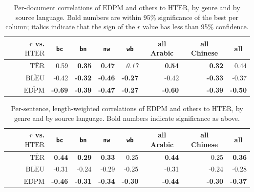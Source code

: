 \documentclass{kluwer}    %
\begin{document}
\begin{article}
\begin{subtable}
  \begin{table}
    \begin{tabular}{r|rrrr|rr|r}
      \hline
      $r$ vs. $\overline{\textrm{HTER}}$ & \multicolumn{1}{c}{\texttt{bc}}
      & \multicolumn{1}{c}{\texttt{bn}} &
      \multicolumn{1}{c}{\texttt{nw}} & \multicolumn{1}{c}{\texttt{wb}}
      & \multicolumn{1}{|c}{all Arabic} & \multicolumn{1}{c|}{all Chinese}
      & \multicolumn{1}{c}{all} \\
      \hline
      $\overline{\textrm{TER}}$
      &  0.59 &  \textbf{0.35} &  \textbf{0.47}&  \textit{0.17}
      & \textbf{0.54} & \textbf{0.32} &  0.44\\
      $\overline{\textrm{BLEU}}$
      & -0.42 & \textbf{-0.32} & \textbf{-0.46}&  \textbf{-0.27}
      & -0.42  &  \textbf{-0.33} & -0.37 \\
      $\overline{\textrm{EDPM}}$
      & \textbf{-0.69} & \textbf{-0.39} & \textbf{-0.47} &
      \textbf{-0.27}
      & \textbf{-0.60} & \textbf{-0.39} & \textbf{-0.50} \\
      \hline
    \end{tabular}
    \caption{Per-document correlations of $\overline{\textrm{EDPM}}$ and others to
      $\overline{\textrm{HTER}}$, by genre and by source language. Bold numbers are
      within 95\% significance of the best per column; italics indicate
      that the sign of the $r$ value has less than 95\% confidence.}
    \label{tab:hterperdoc}
  \end{table}
  \begin{table}
    \begin{tabular}{r|rrrr|rr|r}
      \hline
      $r$ vs. $\overline{\textrm{HTER}}$ & \multicolumn{1}{c}{\texttt{bc}}
      & \multicolumn{1}{c}{\texttt{bn}} &
      \multicolumn{1}{c}{\texttt{nw}} & \multicolumn{1}{c}{\texttt{wb}}
      & \multicolumn{1}{|c}{all Arabic} & \multicolumn{1}{c|}{all Chinese}
      & \multicolumn{1}{c}{all} \\
      \hline
      $\overline{\textrm{TER}}$
      &  \textbf{0.44} &  \textbf{0.29} &  \textbf{0.33}&  0.25
      & \textbf{0.44} & 0.25  &  \textbf{0.36}\\
      $\overline{\textrm{BLEU}}$
      & -0.31 & -0.24  & -0.29 &  -0.25
      & -0.31  &  -0.24  & -0.28 \\
      $\overline{\textrm{EDPM}}$
      & \textbf{-0.46} & \textbf{-0.31} & \textbf{-0.34} &
      \textbf{-0.30}
      & \textbf{-0.44} & \textbf{-0.30} & \textbf{-0.37} \\
      \hline
    \end{tabular}
    \caption{Per-sentence, length-weighted correlations of
      $\overline{\textrm{EDPM}}$ and others to $\overline{\textrm{HTER}}$, by genre and by
      source language. Bold numbers indicate significance as above.}
    \label{tab:hterpersent}
  \end{table}
\end{subtable}



\end{article}
\end{document}
